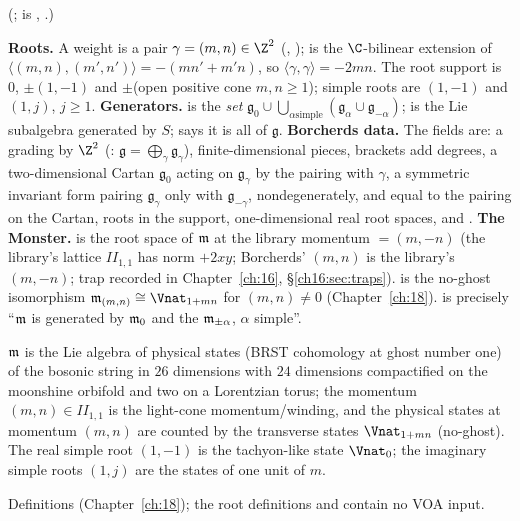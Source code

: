 (;  is
, .)
\begin{dictionary}
\textbf{Roots.}  A weight is a pair $\gamma=(m,n)\in\Z^2$ (, );  is
the $\C$-bilinear extension of $\langle(m,n),(m',n')\rangle=-(mn'+m'n)$, so $\langle\gamma,\gamma\rangle=-2mn$.  The root
support is $0$, $\pm(1,-1)$ and $\pm$(open positive cone $m,n\ge1$); simple roots are $(1,-1)$ and $(1,j)$, $j\ge1$.
\textbf{Generators.}   is the \emph{set} $\mathfrak g_0\cup\bigcup_{\alpha\text{
simple}}(\mathfrak g_\alpha\cup\mathfrak g_{-\alpha})$;  is the Lie subalgebra generated by $S$;
 says it is all of $\mathfrak g$.  \textbf{Borcherds data.}  The fields are: a grading by $\Z^2$
(: $\mathfrak g=\bigoplus_\gamma\mathfrak g_\gamma$), finite-dimensional pieces, brackets add
degrees, a two-dimensional Cartan $\mathfrak g_0$ acting on $\mathfrak g_\gamma$ by the pairing with $\gamma$, a symmetric
invariant form pairing $\mathfrak g_\gamma$ only with $\mathfrak g_{-\gamma}$, nondegenerately, and equal to the pairing on
the Cartan, roots in the support, one-dimensional real root spaces, and .  \textbf{The Monster.}
 is the root space of $\mathfrak m$ at the library momentum 
$=(m,-n)$ (the library's lattice $I\!I_{1,1}$ has norm $+2xy$; Borcherds' $(m,n)$ is the library's $(m,-n)$; trap recorded in
Chapter~\ref{ch:16}, \S\ref{ch16:sec:traps}).   is the no-ghost isomorphism
$\chtwentym_{(m,n)}\cong\Vnat_{1+mn}$ for $(m,n)\ne0$ (Chapter~\ref{ch:18}).   is
precisely ``$\mathfrak m$ is generated by $\mathfrak m_0$ and the $\mathfrak m_{\pm\alpha}$, $\alpha$ simple''.
\end{dictionary}
\begin{physics}
$\mathfrak m$ is the Lie algebra of physical states (BRST cohomology at ghost number one) of the bosonic string in $26$
dimensions with $24$ dimensions compactified on the moonshine orbifold and two on a Lorentzian torus; the momentum
$(m,n)\in I\!I_{1,1}$ is the light-cone momentum/winding, and the physical states at momentum $(m,n)$ are counted by the
transverse states $\Vnat_{1+mn}$ (no-ghost).  The real simple root $(1,-1)$ is the tachyon-like state $\Vnat_0$; the
imaginary simple roots $(1,j)$ are the states of one unit of $m$.
\end{physics}
\begin{status}
Definitions (Chapter~\ref{ch:18}); the root definitions and  contain no VOA input.
\end{status}

